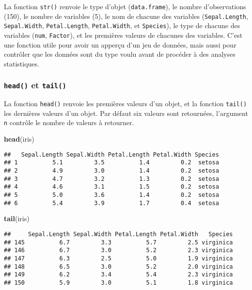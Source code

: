 \documentclass[]{book}
\newenvironment{Shaded}{\begin{snugshade}}{\end{snugshade}}
\newcommand{\KeywordTok}[1]{\textcolor[rgb]{0.13,0.29,0.53}{\textbf{#1}}}
\newcommand{\NormalTok}[1]{#1}
\theoremstyle{definition}
\theoremstyle{definition}
\theoremstyle{definition}
\theoremstyle{remark}
\begin{document}
La fonction \texttt{str()} renvoie le type d'objet
(\texttt{data.frame}), le nombre d'observations (150), le nombre de
variables (5), le nom de chacune des variables (\texttt{Sepal.Length},
\texttt{Sepal.Width}, \texttt{Petal.Length}, \texttt{Petal.Width}, et
\texttt{Species}), le type de chacune des variables (\texttt{num},
\texttt{Factor}), et les premières valeurs de chacunes des variables.
C'est une fonction utile pour avoir un apperçu d'un jeu de données, mais
aussi pour contrôler que les données sont du type voulu avant de
procéder à des analyses statistiques.

\subsubsection{\texorpdfstring{\texttt{head()} et
\texttt{tail()}}{head() et tail()}}\label{l015head}

La fonction \texttt{head()} renvoie les premières valeurs d'un objet, et
la fonction \texttt{tail()} les dernières valeurs d'un objet. Par défaut
six valeurs sont retournées, l'argument \texttt{n} contrôle le nombre de
valeurs à retourner.

\begin{Shaded}
\begin{Highlighting}[]
\KeywordTok{head}\NormalTok{(iris)}
\end{Highlighting}
\end{Shaded}

\begin{verbatim}
##   Sepal.Length Sepal.Width Petal.Length Petal.Width Species
## 1          5.1         3.5          1.4         0.2  setosa
## 2          4.9         3.0          1.4         0.2  setosa
## 3          4.7         3.2          1.3         0.2  setosa
## 4          4.6         3.1          1.5         0.2  setosa
## 5          5.0         3.6          1.4         0.2  setosa
## 6          5.4         3.9          1.7         0.4  setosa
\end{verbatim}

\begin{Shaded}
\begin{Highlighting}[]
\KeywordTok{tail}\NormalTok{(iris)}
\end{Highlighting}
\end{Shaded}

\begin{verbatim}
##     Sepal.Length Sepal.Width Petal.Length Petal.Width   Species
## 145          6.7         3.3          5.7         2.5 virginica
## 146          6.7         3.0          5.2         2.3 virginica
## 147          6.3         2.5          5.0         1.9 virginica
## 148          6.5         3.0          5.2         2.0 virginica
## 149          6.2         3.4          5.4         2.3 virginica
## 150          5.9         3.0          5.1         1.8 virginica
\end{verbatim}
\end{document}
